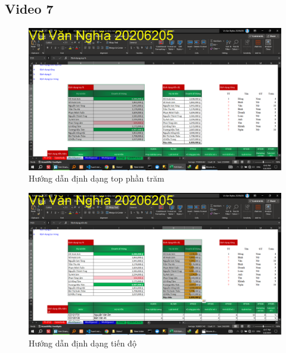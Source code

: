 \documentclass{article}
\begin{document}



\subsection{Video 7}
\begin{figure}[H]
\centering
\includegraphics[scale = 0.15]{Video7/HuongDan/0.png}
\caption{Hướng dẫn định dạng top phần trăm}
\end{figure}

\begin{figure}[H]
\centering
\includegraphics[scale = 0.15]{Video7/HuongDan/1.png}
\caption{Hướng dẫn định dạng tiến độ}
\end{figure}
\end{document}
